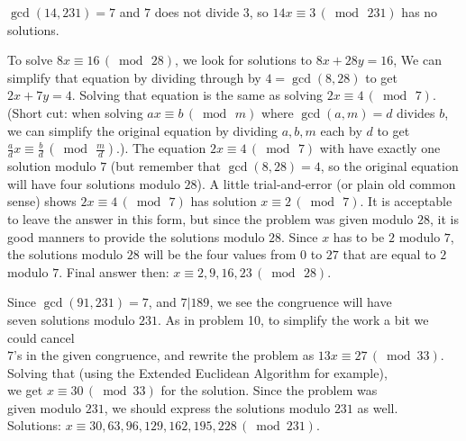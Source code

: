 \begin{Solution}{26.9}
$\gcd(14,231) = 7$ and $7$ does not divide $3$, so $14x\equiv 3\,(\bmod\,231)$ has no solutions.

\end{Solution}

\begin{Solution}{26.10}
To solve $8x \equiv 16\,(\bmod\,28)$, we look for solutions to $8x+28y = 16$, We can simplify that equation by
dividing through by $4 = \gcd(8,28)$ to get $2x + 7y = 4$. Solving that equation is the same as solving
$2x\equiv 4 \, (\bmod \,7)$. (Short cut: when solving $ax\equiv b\,(\bmod\,m)$ where $\gcd(a,m) = d$ divides $b$, we can simplify the original equation by dividing $a,b,m$ each by $d$ to get $\frac{a}{d}x\equiv \frac{b}{d}\,(\bmod\,\frac{m}{d})$.). The equation $2x\equiv 4 \, (\bmod \,7)$ with have exactly one solution modulo $7$ (but remember that $\gcd(8,28) = 4$, so the original equation will have four solutions modulo $28$). A little trial{-}and{-}error
(or plain old common sense) shows  $2x\equiv 4 \, (\bmod \,7)$ has solution $x\equiv 2\,(\bmod\,7)$. It is acceptable to leave the answer in this form, but since the problem was given modulo $28$, it is good manners to provide the solutions modulo $28$. Since $x$ has to be $2$ modulo $7$, the solutions modulo $28$ will be the four values from $0$ to $27$ that are equal to $2$ modulo $7$. Final answer then: $x \equiv 2, 9, 16, 23 \,(\bmod\,28)$.

\end{Solution}

\begin{Solution}{26.11}
Since $\gcd(91,231) = 7$, and $7|189$, we see the congruence will have\\ 
seven solutions modulo $231$. As in problem 10, to simplify the work a bit we could cancel\\
 $7$'s in the given congruence, and rewrite the problem as $13x\equiv 27\,(\bmod{33})$. \\
Solving that (using the Extended Euclidean Algorithm for example),\\
 we get $x\equiv 30\,(\bmod{33})$ for the solution. Since the problem was\\
 given modulo $231$, we should express the solutions modulo $231$ as well. \\
Solutions: $x\equiv 30, 63, 96, 129, 162, 195, 228 \,(\bmod{231})$.

\end{Solution}

